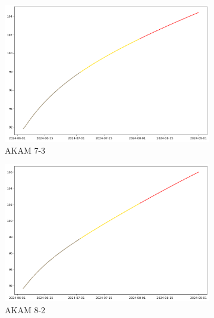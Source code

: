\documentclass{ieeeojies}
\begin{document}
\begin{figure}[H]
    \centering
    \begin{subfigure}[b]{0.33\linewidth}
        \centering
        \includegraphics[width=\linewidth]{GRU Plot/GRU_AKAM_7_3_90days.png}
        \caption{AKAM 7-3}
        \label{fig:akam-7-3}
    \end{subfigure}%
    \hfill
    \begin{subfigure}[b]{0.33\linewidth}
        \centering
        \includegraphics[width=\linewidth]{GRU Plot/GRU_AKAM_8_2_90days.png}
        \caption{AKAM 8-2}
        \label{fig:akam-8-2}
    \end{subfigure}%
    \hfill
    \begin{subfigure}[b]{0.33\linewidth}
        \centering

\end{subfigure}
\end{figure}
\end{document}
